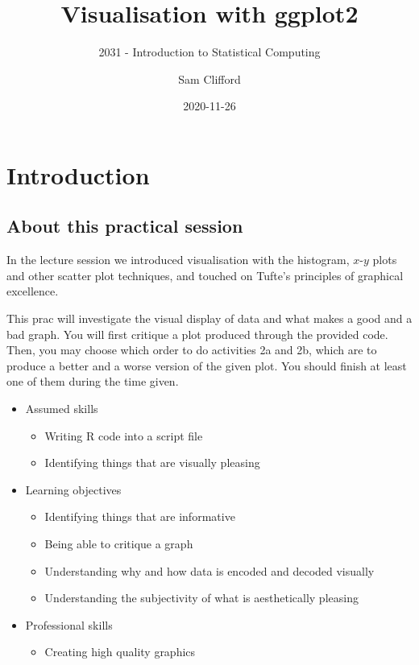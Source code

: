 \documentclass[
]{article}
\title{Visualisation with ggplot2}
\subtitle{2031 - Introduction to Statistical Computing}
\author{Sam Clifford}
\date{2020-11-26}
\providecommand{\tightlist}{%
  \setlength{\itemsep}{0pt}\setlength{\parskip}{0pt}}
\begin{document}
\maketitle

\hypertarget{introduction}{%
\section{Introduction}\label{introduction}}

\hypertarget{about-this-practical-session}{%
\subsection{About this practical
session}\label{about-this-practical-session}}

In the lecture session we introduced visualisation with the histogram,
\(x\)-\(y\) plots and other scatter plot techniques, and touched on
Tufte's principles of graphical excellence.

This prac will investigate the visual display of data and what makes a
good and a bad graph. You will first critique a plot produced through
the provided code. Then, you may choose which order to do activities 2a
and 2b, which are to produce a better and a worse version of the given
plot. You should finish at least one of them during the time given.

\begin{itemize}
\tightlist
\item
  Assumed skills

  \begin{itemize}
  \tightlist
  \item
    Writing R code into a script file
  \item
    Identifying things that are visually pleasing
  \end{itemize}
\item
  Learning objectives

  \begin{itemize}
  \tightlist
  \item
    Identifying things that are informative
  \item
    Being able to critique a graph
  \item
    Understanding why and how data is encoded and decoded visually
  \item
    Understanding the subjectivity of what is aesthetically pleasing
  \end{itemize}
\item
  Professional skills

  \begin{itemize}
  \tightlist
  \item
    Creating high quality graphics
  \end{itemize}
\end{itemize}
\end{document}

